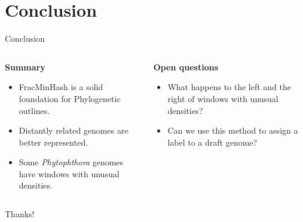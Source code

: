 \documentclass[aspectratio=169]{beamer}
\begin{document}
\section{Conclusion}
\begin{frame}{Conclusion}
    \begin{columns}
        \begin{column}{0.5\textwidth}
            \textbf{Summary}
            \begin{itemize}
                \item FracMinHash is a solid foundation for Phylogenetic outlines.
                \item Distantly related genomes are better represented.
                \item Some \textit{Phytophthora} genomes have windows with
                unusual densities.
            \end{itemize}
        \end{column}
        \begin{column}{0.5\textwidth}
            \textbf{Open questions}
            \begin{itemize}
                \item What happens to the left and the right of windows with
                unusual densities?
                \item Can we use this method to assign a label to a draft genome?
            \end{itemize}
        \end{column}
    \end{columns}
\end{frame}

\begin{frame}[standout]
    Thanks!
\end{frame}
\end{document}
